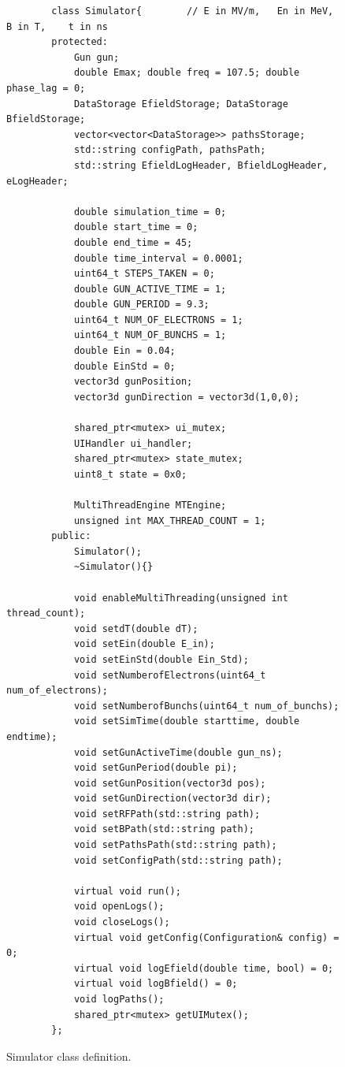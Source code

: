 \documentclass[a4paper,oneside,12pt]{report}
\numberwithin{equation}{chapter}
\begin{document}
\begin{figure}[H]
    \centering
    \begin{verbatim}
        class Simulator{        // E in MV/m,   En in MeV,   B in T,    t in ns
        protected:
            Gun gun;
            double Emax; double freq = 107.5; double phase_lag = 0; 
            DataStorage EfieldStorage; DataStorage BfieldStorage;
            vector<vector<DataStorage>> pathsStorage;
            std::string configPath, pathsPath;
            std::string EfieldLogHeader, BfieldLogHeader, eLogHeader;

            double simulation_time = 0;
            double start_time = 0;
            double end_time = 45;   
            double time_interval = 0.0001;
            uint64_t STEPS_TAKEN = 0;
            double GUN_ACTIVE_TIME = 1;         
            double GUN_PERIOD = 9.3;
            uint64_t NUM_OF_ELECTRONS = 1;
            uint64_t NUM_OF_BUNCHS = 1;
            double Ein = 0.04;
            double EinStd = 0;
            vector3d gunPosition;
            vector3d gunDirection = vector3d(1,0,0);

            shared_ptr<mutex> ui_mutex;
            UIHandler ui_handler;
            shared_ptr<mutex> state_mutex;
            uint8_t state = 0x0;

            MultiThreadEngine MTEngine;
            unsigned int MAX_THREAD_COUNT = 1;
        public:
            Simulator();
            ~Simulator(){}

            void enableMultiThreading(unsigned int thread_count);
            void setdT(double dT);
            void setEin(double E_in);
            void setEinStd(double Ein_Std);
            void setNumberofElectrons(uint64_t num_of_electrons);
            void setNumberofBunchs(uint64_t num_of_bunchs);
            void setSimTime(double starttime, double endtime);
            void setGunActiveTime(double gun_ns);
            void setGunPeriod(double pi);
            void setGunPosition(vector3d pos);
            void setGunDirection(vector3d dir);
            void setRFPath(std::string path);
            void setBPath(std::string path);
            void setPathsPath(std::string path);
            void setConfigPath(std::string path);

            virtual void run();
            void openLogs();
            void closeLogs();
            virtual void getConfig(Configuration& config) = 0;
            virtual void logEfield(double time, bool) = 0;
            virtual void logBfield() = 0;
            void logPaths();
            shared_ptr<mutex> getUIMutex();
        };
    \end{verbatim}
    \vspace{10pt}
    \caption{Simulator class definition.}
    \label{fig:sim_class}
\end{figure}
\end{document}
